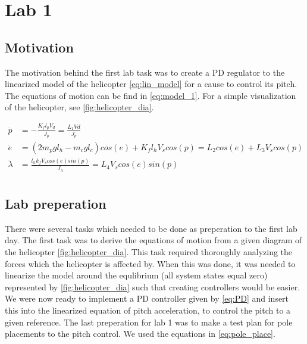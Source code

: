 \section{Lab 1}
\subsection{Motivation}\label{sec:lab1_mot}
The motivation behind the first lab task was to create a PD regulator to the linearized
model of the helicopter \ref{eq:lin_model} for a cause to control its pitch. The equations
of motion can be find in \ref{eq:model_1}. For a simple visualization of the helicopter, see \ref{fig:helicopter_dia}.

\begin{subequations}\label{eq:model_1}
	\begin{align}
		\ddot{p}  &= -\frac{K_{f}l_{p}V_{d}}{J_{p}} = \frac{L_1Vd}{J_p} \label{eq:model_1_p} \\
		\ddot{e}  &= (2m_pgl_h-m_cgl_c)cos(e)+K_fl_hV_scos(p) = L_2cos(e)+L_3V_scos(p)\label{eq:model_1_e} \\
		\ddot{\lambda} &= \frac{l_hk_fV_scos(e)sin(p)}{J_{\lambda}} = L_4V_scos(e)sin(p) \label{eq:model_1_l} \\
	\end{align}
\end{subequations}

\subsection{Lab preperation}\label{sec:lab1_prep}
There were several tasks which needed to be done as preperation to the first lab day.
The first task was to derive the equations of motion from a given diagram of the helicopter \ref{fig:helicopter_dia}.
This task required thoroughly analyzing the forces which the helicopter is affected by.
When this was done, it was needed to linearize the model around the equlibrium (all system states equal zero) represented by \ref{fig:helicopter_dia} such that 
creating controllers would be easier. We were now ready to implement a PD controller given by \ref{eq:PD}
and insert this into the linearized equation of pitch acceleration, to control the pitch to a given reference.
The last preperation for lab 1 was to make a test plan for pole placements to the pitch control. We used the equations in \ref{eq:pole_place}.

